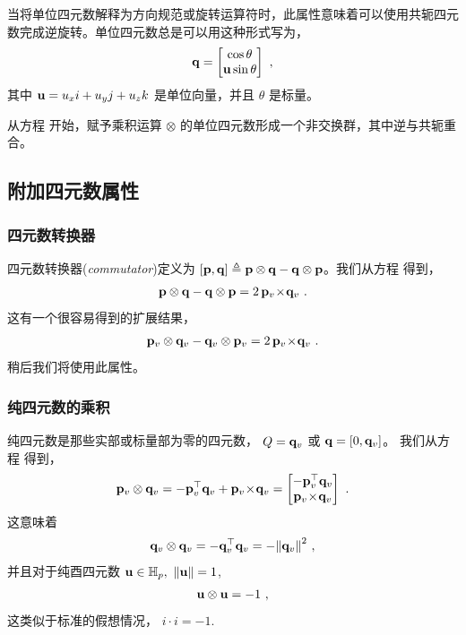 当将单位四元数解释为方向规范或旋转运算符时，此属性意味着可以使用共轭四元数完成逆旋转。单位四元数总是可以用这种形式写为，
%
\begin{align}
{\bf q} = \begin{bmatrix}
\cos\theta \\ {\bf u}\sin\theta
\end{bmatrix}
~,
\end{align}
%
其中 ${\bf u} = u_x i + u_y j + u_z k$ 是单位向量，并且 $\theta$ 是标量。 

从方程  开始，赋予乘积运算 $\otimes$ 的单位四元数形成一个非交换群，其中逆与共轭重合。 


\subsection{附加四元数属性}

\subsubsection{四元数转换器}

四元数转换器(\emph{commutator})定义为 $[{\bf p},{\bf q}]\triangleq{\bf p}\otimes{\bf q}-{\bf q}\otimes{\bf p}$。我们从方程  得到，
%
\begin{align}
{\bf p}\otimes{\bf q}-{\bf q}\otimes{\bf p} = 2\,{\bf p}_v\!\times\!{\bf q}_v
~.
\label{equ:quatCommutator}
\end{align}
%
这有一个很容易得到的扩展结果，
%
\begin{align}
{\bf p}_v\otimes{\bf q}_v-{\bf q}_v\otimes{\bf p}_v = 2\,{\bf p}_v\!\times\!{\bf q}_v
~.
\label{equ:quatCommutatorPure}
\end{align}
%
稍后我们将使用此属性。


\subsubsection{纯四元数的乘积}

纯四元数是那些实部或标量部为零的四元数， $Q={\bf q}_v$ 或 ${\bf q}=[0,{\bf q}_v]$。 我们从方程  得到，
%
\begin{align}
{\bf p}_v\otimes{\bf q}_v 
= -{\bf p}_v^{\top}{\bf q}_v + {\bf p}_v\!\times\!{\bf q}_v
= \begin{bmatrix}
-{\bf p}_v^{\top}{\bf q}_v \\
{\bf p}_v\!\times\!{\bf q}_v
\end{bmatrix}~.
\label{equ:quatProdPure}
\end{align}
%
这意味着
%
\begin{align}
{\bf q}_v\otimes{\bf q}_v = -{\bf q}_v^{\top}{\bf q}_v = -{\left\|{\bf q}_v\right\|}^2~,
\label{equ:quatPureSquared}
\end{align}
%
并且对于纯酉四元数 ${\bf u}\in{\mathbb H}_p,~ {\left\|{\bf u}\right\|}=1$,
%
\begin{align}
{\bf u}\otimes{\bf u} = -1
~,
\end{align}
%
这类似于标准的假想情况， $i\cdot i=-1$.

